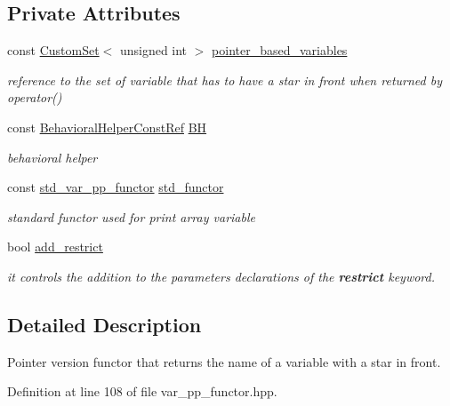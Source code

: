 \subsection*{Private Attributes}
\begin{DoxyCompactItemize}
\item 
const \hyperlink{custom__set_8hpp_a615bc2f42fc38a4bb1790d12c759e86f}{Custom\+Set}$<$ unsigned int $>$ \hyperlink{structpointer__var__pp__functor_a96609ad745aa13d17744abba4373a059}{pointer\+\_\+based\+\_\+variables}
\begin{DoxyCompactList}\small\item\em reference to the set of variable that has to have a star in front when returned by operator() \end{DoxyCompactList}\item 
const \hyperlink{behavioral__helper_8hpp_aae973b54cac87eef3b27442aa3e1e425}{Behavioral\+Helper\+Const\+Ref} \hyperlink{structpointer__var__pp__functor_a115f115b53e9f803772b7899749d7d58}{BH}
\begin{DoxyCompactList}\small\item\em behavioral helper \end{DoxyCompactList}\item 
const \hyperlink{structstd__var__pp__functor}{std\+\_\+var\+\_\+pp\+\_\+functor} \hyperlink{structpointer__var__pp__functor_a808812fcbc81aefcf8c379faaff4184e}{std\+\_\+functor}
\begin{DoxyCompactList}\small\item\em standard functor used for print array variable \end{DoxyCompactList}\item 
bool \hyperlink{structpointer__var__pp__functor_a82b8606531c82524d5d1546c211ea02d}{add\+\_\+restrict}
\begin{DoxyCompactList}\small\item\em it controls the addition to the parameters declarations of the {\bfseries restrict} keyword. \end{DoxyCompactList}\end{DoxyCompactItemize}


\subsection{Detailed Description}
Pointer version functor that returns the name of a variable with a star in front. 

Definition at line 108 of file var\+\_\+pp\+\_\+functor.\+hpp.



